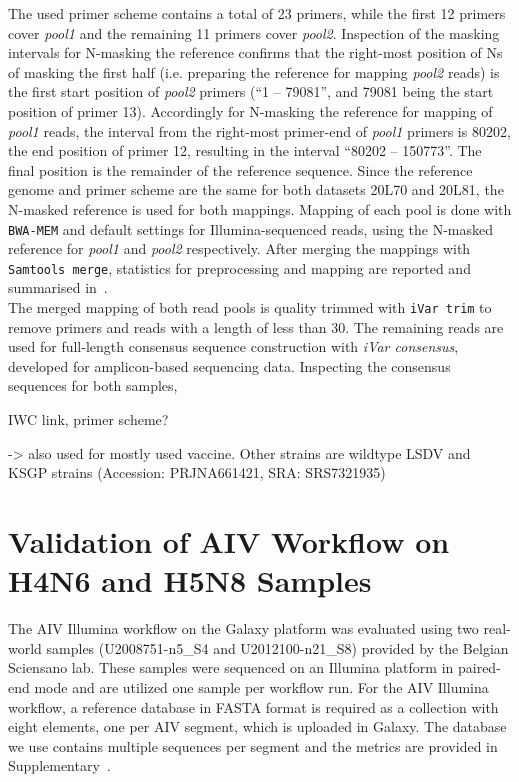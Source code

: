 The used primer scheme contains a total of 23 primers, while the first 12 primers cover \textit{pool1} and the remaining 11 primers cover \textit{pool2}. Inspection of the masking intervals for N-masking the reference confirms that the right-most position of Ns of masking the first half (i.e. preparing the reference for mapping \textit{pool2} reads) is the first start position of \textit{pool2} primers (``1 -- 79081'', and 79081 being the start position of primer 13). Accordingly for N-masking the reference for mapping of \textit{pool1} reads, the interval from the right-most primer-end of \textit{pool1} primers is 80202, the end position of primer 12, resulting in the interval ``80202 -- 150773''. The final position is the remainder of the reference sequence. Since the reference genome and primer scheme are the same for both datasets 20L70 and 20L81, the N-masked reference is used for both mappings. Mapping of each pool is done with \texttt{BWA-MEM} and default settings for Illumina-sequenced reads, using the N-masked reference for \textit{pool1} and \textit{pool2} respectively. After merging the mappings with \texttt{Samtools merge}, statistics for preprocessing and mapping are reported and summarised in~. \\
The merged mapping of both read pools is quality trimmed with \texttt{iVar trim} to remove primers and reads with a length of less than 30. The remaining reads are used for full-length consensus sequence construction with \textit{iVar consensus}, developed for amplicon-based sequencing data. Inspecting the consensus sequences for both samples, %

\todoit
\ac{IWC} link, primer scheme?

-> also used for mostly used vaccine. Other strains are wildtype LSDV and KSGP strains (Accession: PRJNA661421, SRA: SRS7321935)


\section{Validation of AIV Workflow on H4N6 and H5N8 Samples}\label{sec:4-aiv}
The AIV Illumina workflow on the Galaxy platform was evaluated using two real-world samples (U2008751-n5\_S4 and U2012100-n21\_S8) provided by the Belgian Sciensano lab. These samples were sequenced on an Illumina platform in paired-end mode and are utilized one sample per workflow run. For the AIV Illumina workflow, a reference database in FASTA format is required as a collection with eight elements, one per AIV segment, which is uploaded in Galaxy. The database we use contains multiple sequences per segment and the metrics are provided in Supplementary~.

